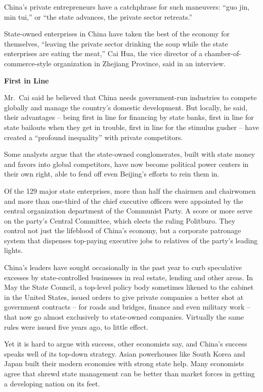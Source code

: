 ﻿\documentclass[12pt]{article}
\begin{document}
China's private entrepreneurs have a catchphrase for such maneuvers: ``guo jin, min tui,'' or ``the
state advances, the private sector retreats.''

State-owned enterprises in China have taken the best of the economy for themselves, ``leaving the
private sector drinking the soup while the state enterprises are eating the meat,'' Cai Hua, the
vice director of a chamber-of-commerce-style organization in Zhejiang Province, said in an
interview.

\textbf{First in Line}

Mr.~Cai said he believed that China needs government-run industries to compete globally and manage
the country's domestic development. But locally, he said, their advantages -- being first in line
for financing by state banks, first in line for state bailouts when they get in trouble, first in
line for the stimulus gusher -- have created a ``profound inequality'' with private competitors.

Some analysts argue that the state-owned conglomerates, built with state money and favors into
global competitors, have now become political power centers in their own right, able to fend off
even Beijing's efforts to rein them in.

Of the 129 major state enterprises, more than half the chairmen and chairwomen and more than
one-third of the chief executive officers were appointed by the central organization department of
the Communist Party. A score or more serve on the party's Central Committee, which elects the ruling
Politburo. They control not just the lifeblood of China's economy, but a corporate patronage system
that dispenses top-paying executive jobs to relatives of the party's leading lights.

China's leaders have sought occasionally in the past year to curb speculative excesses by
state-controlled businesses in real estate, lending and other areas. In May the State Council, a
top-level policy body sometimes likened to the cabinet in the United States, issued orders to give
private companies a better shot at government contracts -- for roads and bridges, finance and even
military work -- that now go almost exclusively to state-owned companies. Virtually the same rules
were issued five years ago, to little effect.

Yet it is hard to argue with success, other economists say, and China's success speaks well of its
top-down strategy. Asian powerhouses like South Korea and Japan built their modern economies with
strong state help. Many economists agree that shrewd state management can be better than market
forces in getting a developing nation on its feet.
\end{document}

